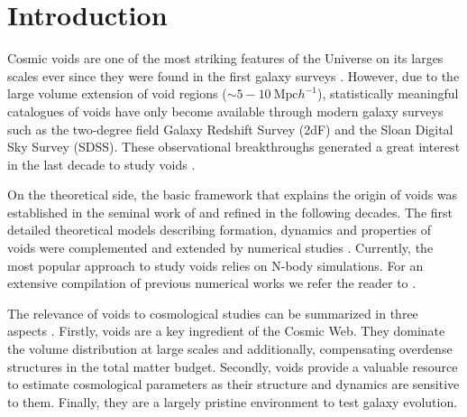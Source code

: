 \documentclass[a4,useAMS,usenatbib,usegraphicx]{mn2e}
\begin{document}

\section{Introduction}
\label{sec:introduction}

Cosmic voids are one of the most striking features of the
Universe on its larges scales ever since they were found in the first
galaxy surveys \citep{Chincarini75, Gregory78, Einasto80M, Einasto80N,
  Kirshner81, Zeldovich82,Kirshner87}.  
However, due to the large volume extension of void regions ($\sim
5-10\ \mbox{Mpc}  h^{-1}$), statistically meaningful catalogues of
voids \citep{Pan10,  Sutter12b, Nadathur14} have only become available
through modern galaxy surveys such as the two-degree field Galaxy
Redshift Survey (2dF) \citep{ Colless01, Colless03} and the Sloan
Digital Sky Survey (SDSS)\citep{York00, Abazajian03}.
These observational breakthroughs generated a great interest in the last
decade to study voids \citep{Hoyle04, Croton04, Padilla05, Rojas05,
  Ceccarelli06, Patiri06a, Tikhonov06, Patiri06b,Tikhonov07,
  BendaBeckmann08, Foster09, Ceccarelli13, Paz13, Sutter14a}. 


On the theoretical side, the basic framework that explains
the origin of voids was established in the seminal work of
\citet{Zeldovich70} and refined in the following decades.  
The first detailed theoretical models describing formation, dynamics
and properties of  voids \citep{Hoffman82, Icke84, Bertschinger85,
  Blumenthal92} were  complemented and extended by numerical studies
\citep{Martel90, Regos91, Weygaert93, Dubinski93, Bond96}. 
Currently, the most popular approach to study voids relies on N-body
simulations. For an extensive compilation of previous  
numerical works we refer the reader to \citet{Colberg08}.


The relevance of voids to cosmological studies can be summarized in
three aspects \citep{Platen07}. 
Firstly, voids are a key ingredient of the Cosmic Web. 
They dominate the volume distribution at large scales and
additionally, compensating overdense structures in the total matter
budget. 
Secondly, voids provide a valuable resource to estimate  
cosmological parameters as their structure and dynamics are sensitive
to them. 
Finally, they are a largely pristine environment to test galaxy
evolution. 
\end{document}
